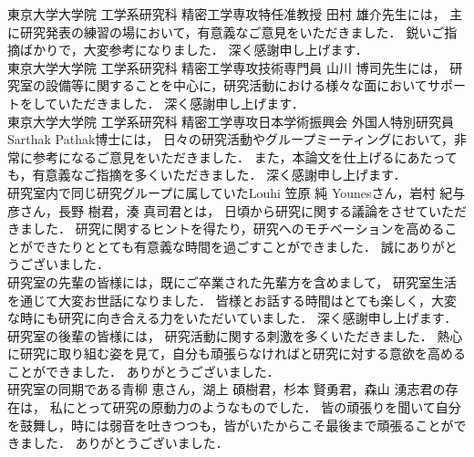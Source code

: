 東京大学大学院 工学系研究科 精密工学専攻特任准教授 田村 雄介先生には，
主に研究発表の練習の場において，有意義なご意見をいただきました．
鋭いご指摘ばかりで，大変参考になりました．
深く感謝申し上げます．
\\



東京大学大学院 工学系研究科 精密工学専攻技術専門員 山川 博司先生には，
研究室の設備等に関することを中心に，研究活動における様々な面においてサポートをしていただきました．
深く感謝申し上げます．
\\




東京大学大学院 工学系研究科 精密工学専攻日本学術振興会 外国人特別研究員 Sarthak Pathak博士には，
日々の研究活動やグループミーティングにおいて，非常に参考になるご意見をいただきました．
また，本論文を仕上げるにあたっても，有意義なご指摘を多くいただきました．
深く感謝申し上げます．
\\




研究室内で同じ研究グループに属していたLouhi 笠原 純 Younesさん，岩村 紀与彦さん，長野 樹君，湊 真司君とは，
日頃から研究に関する議論をさせていただきました．
研究に関するヒントを得たり，研究へのモチベーションを高めることができたりととても有意義な時間を過ごすことができました．
誠にありがとうございました．
\\


研究室の先輩の皆様には，既にご卒業された先輩方を含めまして，
研究室生活を通じて大変お世話になりました．
皆様とお話する時間はとても楽しく，大変な時にも研究に向き合える力をいただいていました．
深く感謝申し上げます．
\\


研究室の後輩の皆様には，
研究活動に関する刺激を多くいただきました．
熱心に研究に取り組む姿を見て，自分も頑張らなければと研究に対する意欲を高めることができました．
ありがとうございました．
\\

研究室の同期である青柳 恵さん，湖上 碩樹君，杉本 賢勇君，森山 湧志君の存在は，
私にとって研究の原動力のようなものでした．
皆の頑張りを聞いて自分を鼓舞し，時には弱音を吐きつつも，皆がいたからこそ最後まで頑張ることができました．
ありがとうございました．
\\




